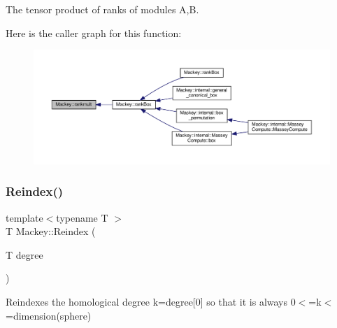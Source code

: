 The tensor product of ranks of modules A,B. 

Here is the caller graph for this function\+:\nopagebreak
\begin{figure}[H]
\begin{center}
\leavevmode
\includegraphics[width=350pt]{namespaceMackey_aaa0ce7673970bf261628768fb11a1995_icgraph}
\end{center}
\end{figure}
\mbox{\label{namespaceMackey_a7da73ade3ee83c4ffd614e79242d7c04}} 
\subsubsection{\texorpdfstring{Reindex()}{Reindex()}\hspace{0.1cm}{\footnotesize\ttfamily [1/2]}}
{\footnotesize\ttfamily template$<$typename T $>$ \\
T Mackey\+::\+Reindex (\begin{DoxyParamCaption}\item[{T}]{degree }\end{DoxyParamCaption})\hspace{0.3cm}{\ttfamily [inline]}}



Reindexes the homological degree k=degree\mbox{[}0\mbox{]} so that it is always 0$<$=k$<$=dimension(sphere) 

